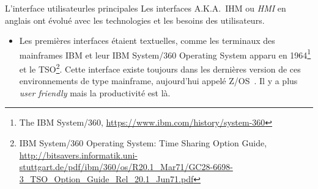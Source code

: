 \documentclass{beamer}
\begin{document}
    \begin{frame}{L'interface utilisateur}{les principales}
        Les interfaces A.K.A.\ IHM ou \textit{HMI} en anglais ont évolué avec les technologies et les besoins des utilisateurs.
        \begin{itemize}
            \item Les premières interfaces étaient textuelles, comme les terminaux des mainframes IBM et leur IBM System/360 Operating System apparu en 1964\footnote{The IBM System/360, \url{https://www.ibm.com/history/system-360}} et le TSO\footnote{IBM System/360 Operating System: Time Sharing Option Guide, \url{http://bitsavers.informatik.uni-stuttgart.de/pdf/ibm/360/os/R20.1_Mar71/GC28-6698-3_TSO_Option_Guide_Rel_20.1_Jun71.pdf}}.
            Cette interface existe toujours dans les dernières version de ces environnements de type mainframe, aujourd'hui appelé Z/OS~.
            Il y a plus \textit{user friendly} mais la productivité est là.
        \end{itemize}
    \end{frame}
\end{document}
